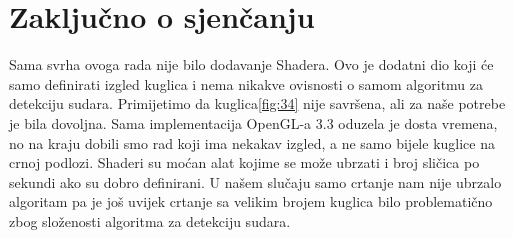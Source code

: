 \section{Zaključno o sjenčanju}
Sama svrha ovoga rada nije bilo dodavanje Shadera. Ovo je dodatni dio koji će samo definirati izgled kuglica i nema nikakve ovisnosti o samom algoritmu za detekciju sudara. Primijetimo da kuglica\ref{fig:34} nije savršena, ali za naše potrebe je bila dovoljna. Sama implementacija OpenGL-a 3.3 oduzela je dosta vremena, no na kraju dobili smo rad koji ima nekakav izgled, a ne samo bijele kuglice na crnoj podlozi. Shaderi su moćan alat kojime se može ubrzati i broj sličica po sekundi ako su dobro definirani\cite{15}. U našem slučaju samo crtanje nam nije ubrzalo algoritam pa je još uvijek crtanje sa velikim brojem kuglica bilo problematično zbog složenosti algoritma za detekciju sudara.